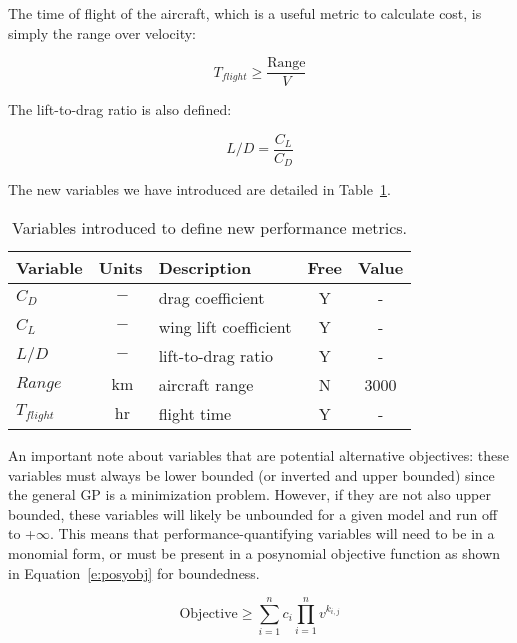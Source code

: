 The time of flight of the aircraft, which is a useful metric to calculate cost,
is simply the range over velocity:

\begin{equation}
    T_{flight} \geq \frac{\mathrm{Range}}{V}
\end{equation}

The lift-to-drag ratio is also defined: 

\begin{equation}
    L/D = \frac{C_L}{C_D}    
\end{equation}

The new variables we have introduced are detailed in Table~\ref{t:vars_perfMetrics}.

\begin{footnotesize}
\begin{table}
    \centering
    \begin{tabular}{ l c l c c }
        \toprule
        Variable & Units & Description & Free & Value \\
        \midrule
        $C_D$ & $~\mathrm{-}$ & drag coefficient & Y & - \\
        $C_L$ & $~\mathrm{-}$ & wing lift coefficient & Y & - \\
        $L/D$ & $~\mathrm{-}$ & lift-to-drag ratio & Y & - \\
        $Range$ & $~\mathrm{km}$ & aircraft range & N & 3000 \\
        $T_{flight}$ & $~\mathrm{hr}$ & flight time & Y & - \\
        \bottomrule
    \end{tabular}
    \caption{Variables introduced to define new performance metrics.}
    \label{t:vars_perfMetrics}
\end{table} \end{footnotesize}

An important note about variables that are potential alternative objectives: these variables
must always be lower bounded (or inverted and upper bounded) since the general \gls{GP} is a
minimization problem. However, if they are not also upper bounded, these variables
will likely be unbounded for a given model and run off to +$\infty$. This means that
performance-quantifying variables will need to be in a monomial form,
or must be present in a posynomial objective
function as shown in Equation~\ref{e:posyobj} for boundedness.

\begin{equation}
    \mathrm{Objective} \geq \sum\limits^n_{i=1}c_{i}\prod\limits^n_{i=1}  v^{k_{i,j}}
    \label{e:posyobj}
\end{equation}

